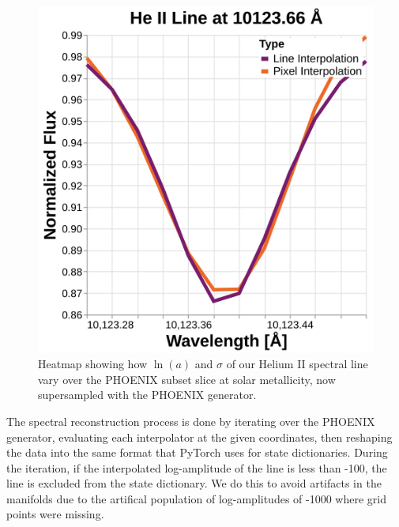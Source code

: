 \documentclass[twocolumn]{aastex631}
\begin{document}
\begin{figure}
    \centering
    \includegraphics[width=\textwidth]{figure6}
    \caption{Heatmap showing how $\ln(a)$ and $\sigma$ of our Helium II spectral line vary over the PHOENIX subset slice at solar metallicity, now supersampled with the PHOENIX generator.}
    \label{fig:figure6}
\end{figure}

The spectral reconstruction process is done by iterating over the PHOENIX generator, evaluating each interpolator at the given coordinates, then reshaping the data into the same format that PyTorch uses for state dictionaries. 
During the iteration, if the interpolated log-amplitude of the line is less than -100, the line is excluded from the state dictionary. 
We do this to avoid artifacts in the manifolds due to the artifical population of log-amplitudes of -1000 where grid points were missing.
\end{document}
